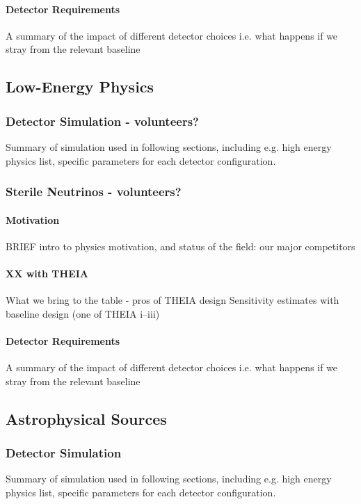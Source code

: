\documentclass[11pt,prd,letterpaper,amsmath,amssymb,final,nofootinbib
,unsortedaddress,superscriptaddress
]{revtex4-1}
\begin{document}
\paragraph{Detector Requirements}
A summary of the impact of different detector choices i.e. what happens if we stray from the relevant baseline

\subsection{Low-Energy Physics}
\subsubsection{Detector Simulation - \bf volunteers?}
Summary of simulation used in following sections, including e.g. high energy physics list, specific parameters for each detector configuration.




\subsubsection{Sterile Neutrinos - \bf volunteers?}
\paragraph{Motivation}
BRIEF intro to physics motivation, and status of the field: our major competitors
\paragraph{XX with THEIA}
What we bring to the table - pros of THEIA design \newline
Sensitivity estimates with baseline design (one of THEIA i--iii)
\paragraph{Detector Requirements}
A summary of the impact of different detector choices i.e. what happens if we stray from the relevant baseline


\subsection{Astrophysical Sources}
\subsubsection{Detector Simulation}
Summary of simulation used in following sections, including e.g. high energy physics list, specific parameters for each detector configuration.
\end{document}
